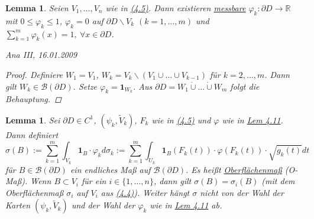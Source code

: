 \documentclass[a4paper]{scrreprt}
\newcommand{\doubleOne}{\textbf{1}}
\newcommand{\R}{\mathbb{R}}
\newcommand{\Borel}{\mathcal{B}}
\newcommand{\dcup}{\dot{\cup}}
\newcommand{\jlabel}[1]{\label{j_#1}}
\newcommand{\jhyperref}[2]{\hyperref[j_#1]{#2}}
\newcommand{\jlink}[1]{\jhyperref{#1}{#1}}
\newcommand{\jabb}[3]{ #1: #2 \rightarrow #3 }
\newcommand{\jspacesmall}{\vspace{4pt}}
\newcommand{\jdate}[1]{\jspacesmall\begin{center}\jlabel{#1}\tiny{Ana III, #1}\end{center}}
\theoremstyle{plain}
\newtheorem{lem}[thm]{Lemma}
\theoremstyle{definition}
\begin{document}
{{{{\begin{lem}
    \jlabel{Lem 4.11}
    Seien $V_1,\dots,V_n$ wie in \jlink{(4.5)}. Dann existieren \jhyperref{messbar}{messbare} $\jabb{\varphi_k}{\partial D}{\R}$ mit $0 \le \varphi_k \le 1$, $\varphi_k = 0$ auf $\partial D\backslash V_k$ $(k=1,\dots,m)$ und $\sum_{k=1}^m \varphi_k(x) = 1, \ \forall x \in \partial D$.
    
\jdate{16.01.2009}
    
    \begin{proof}
        Definiere $W_1 = V_1$, $W_k = V_k\backslash (V_1 \cup \dots \cup V_{k-1})$ für $k=2,\dots,m$. Dann gilt $W_k \in \Borel(\partial D)$. Setze $\varphi_k = \doubleOne_{W_k}$. Aus $\partial D = W_1 \dcup \dots \dcup W_m$ folgt die Behauptung.
    \end{proof}
\end{lem}

\begin{lem}
    \jlabel{Lem 4.12}
    Sei $\partial D \in C^1$, $(\psi_k, \tilde{V}_k)$, $F_k$ wie in \jlink{(4.5)} und $\varphi$ wie in \jlink{Lem 4.11}. Dann definiert
    \[
        \sigma(B) := \sum_{k=1}^m \int_{V_k} \doubleOne_B \cdot \varphi_k d\sigma_k := \sum_{k=1}^m \int_{U_k} \doubleOne_B(F_k(t))\cdot \varphi(F_k(t)) \cdot \sqrt{g_k(t)} dt
    \]
    für $B\in \Borel(\partial D)$ ein endliches Maß auf $\Borel(\partial D)$. Es heißt \uline{Oberflächenmaß} (O-Maß). Wenn $B\subset V_i$ für ein $i\in \{1,\dots,n\}$, dann gilt $\sigma(B) = \sigma_i(B)$ (mit dem Oberflächenmaß $\sigma_i$ auf $V_i$ aus \jlink{(4.4)}). Weiter hängt $\sigma$ nicht von der Wahl der Karten $(\psi_k, \tilde{V}_k)$ und der Wahl der $\varphi_k$ wie in \jlink{Lem 4.11} ab.
    

\end{lem}}}}}
\end{document}
